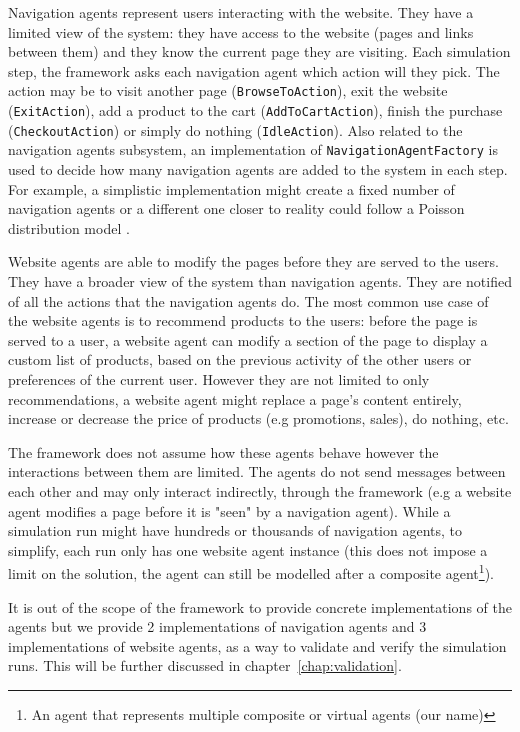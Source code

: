 Navigation agents represent users interacting with the website. They have a 
limited view of the system: they have access to the website (pages and links 
between them) and they know the current page they are visiting. Each simulation 
step, the framework asks each navigation agent which action will they pick. The 
action may be to visit another page (\texttt{BrowseToAction}), exit the 
website (\texttt{ExitAction}), add a product to the cart 
(\texttt{AddToCartAction}), finish the purchase (\texttt{CheckoutAction}) 
or simply do nothing (\texttt{IdleAction}). Also related to the navigation 
agents subsystem, an implementation of \texttt{NavigationAgentFactory} is 
used to decide how many navigation agents are added to the system in each step. 
For example, a simplistic implementation might create a fixed number of 
navigation agents or a different one closer to reality could follow a Poisson 
distribution model \cite{gunduz2003poisson}.


Website agents are able to modify the pages before they are served to the 
users. They have a broader view of the system than navigation agents. They are 
notified of all the actions that the navigation agents do. The most common use 
case of the website agents is to recommend products to the users: before the 
page is served to a user, a website agent can modify a section of the page to 
display a custom list of products, based on the previous activity of the other 
users or preferences of the current user. However they are not limited to only 
recommendations, a website agent might replace a page's content entirely, 
increase or decrease the price of products (e.g promotions, sales), do nothing, 
etc.

The framework does not assume how these agents behave however the interactions 
between them are limited. The agents do not send messages between each other 
and may only interact indirectly, through the framework (e.g a website agent 
modifies a page before it is "seen" by a navigation agent). While a simulation 
run might have hundreds or thousands of navigation agents, to simplify, each 
run only has one website agent instance (this does not impose a limit on the 
solution, the agent can still be modelled after a composite agent\footnote{An 
    agent that represents multiple composite or virtual agents (our name)}).

It is out of the scope of the framework to provide concrete implementations of 
the agents but we provide 2 implementations of navigation agents and 3 
implementations of website agents, as a way to validate and verify the 
simulation runs. This will be further discussed in 
chapter~\ref{chap:validation}.

